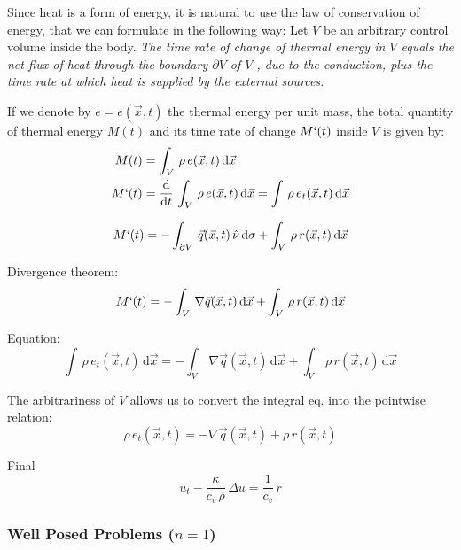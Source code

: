 \documentclass[../main.tex]{subfiles}
\begin{document}
Since heat is a form of energy, it is natural to use the law of conservation of energy, that we can formulate in the following way: Let $V$ be an arbitrary control volume inside the body. \textit{The time rate of change of thermal energy in $V$ equals the net flux of heat through the boundary $\partial V$ of $V$ , due to the conduction, plus the time rate at which heat is supplied by the external sources.}

If we denote by $e = e(\vec{x},t)$ the thermal energy per unit mass, the total quantity of thermal energy $M(t)$ and its time rate of change $M`(t)$ inside $V$ is given by:
\begin{align}
    M(t) &= \int_V \, \rho \, e(\vec{x},t) \, \mathrm{d} \vec{x} \\
    M`(t) &= \frac{\mathrm{d}}{\mathrm{d} t} \, \int_V \, \rho \, e(\vec{x},t) \, \mathrm{d} \vec{x} = \int \, \rho \, e_t(\vec{x},t) \, \mathrm{d} \vec{x}
\end{align}

\begin{equation}
    M`(t) = - \int_{\partial V} \, \vec{q}(\vec{x},t) \, \hat{\nu} \, \mathrm{d} \sigma + \int_V \, \rho \, r(\vec{x},t) \, \mathrm{d} \vec{x}
\end{equation}

Divergence theorem:
\begin{equation}
    M`(t) = - \int_{V} \, \nabla \vec{q}(\vec{x},t) \, \mathrm{d} \vec{x} + \int_V \, \rho \, r(\vec{x},t) \, \mathrm{d} \vec{x}
\end{equation}

Equation:
\begin{equation}
    \int \, \rho \, e_t(\vec{x},t) \, \mathrm{d} \vec{x} = - \int_{V} \, \nabla \vec{q}(\vec{x},t) \, \mathrm{d} \vec{x} + \int_V \, \rho \, r(\vec{x},t) \, \mathrm{d} \vec{x}
\end{equation}

The arbitrariness of $V$ allows us to convert the integral eq. into the pointwise relation:
\begin{equation}
    \rho \, e_t(\vec{x},t) = - \nabla \vec{q}(\vec{x},t) + \rho \, r(\vec{x},t)
\end{equation}

Final
\begin{equation}
    u_t - \frac{\kappa}{c_v \, \rho} \, \Delta u = \frac{1}{c_v} \, r
\end{equation}

\subsubsection{Well Posed Problems ($n = 1$)} \label{sec:2.1.3}
\end{document}
